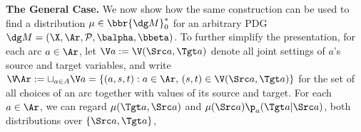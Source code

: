 \endgroup

\textbf{The General Case.}
We now show how the same construction can be used to find
 a distribution $\mu \in \bbr{\dg M}^*_0$
for an arbitrary PDG $\dg M = (\X, \Ar, \mathcal P, \balpha, \bbeta)$.
%
To further simplify the presentation,
for each arc $a \in \Ar$, let
$\V a := \V(\Src a, \Tgt a)$
denote all joint settings of $a$'s source and target variables, and
write
$
\V\!\Ar :%
    = \sqcup_{a \in A} \V a
    = \{ (a, s, t) : a \in \Ar,\, (s,t) \in \V(\Src a,\Tgt a) \}
$
for the set of all choices of an arc together with values of its source and target.
%
For each $a \in \Ar$, 
we can regard $\mu(\Tgt a, \Src a)$ and $\mu(\Src a)\p_a(\Tgt a | \Src a)$, both distributions over $\{\Src a,\Tgt a\}$, 
